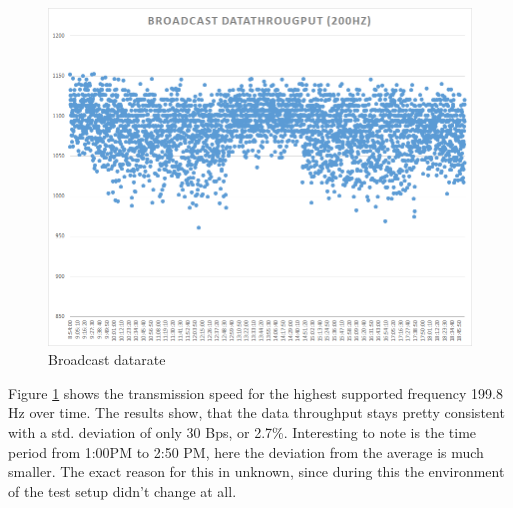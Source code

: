 \begin{description}
	\begin{figure}[H]
		\centering
		\includegraphics[scale=0.5]{./pics/exp1_long.png}
		\caption{Broadcast datarate}\label{fig:exp1long}
	\end{figure}
	Figure \ref{fig:exp1long} shows the transmission speed for the highest supported frequency 199.8 Hz over time. The results show, that  the data throughput stays pretty consistent with a std. deviation of only 30 Bps, or 2.7\%. Interesting to note is the time period from 1:00PM to 2:50 PM, here the deviation from the average is much smaller. The exact reason for this in unknown, since during this the environment of the test setup didn't change at all.
\end{description}
\newpage

